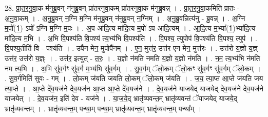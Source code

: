 \documentclass[17pt]{extarticle}
\begin{document}
28. प्रा॒त॒र॒नु॒वा॒क म॑नुब्रु॒वन् न॑नुब्रु॒वन् प्रा॑तरनुवा॒कम् प्रा॑तरनुवा॒क म॑नुब्रु॒वन्न् । . प्रा॒त॒र॒नु॒वा॒कमिति॑ प्रातः - अ॒नु॒वा॒कम् । . अ॒नु॒ब्रु॒वन् न॒ग्नि म॒ग्नि म॑नुब्रु॒वन् न॑नुब्रु॒वन् न॒ग्निम् । . अ॒नु॒ब्रु॒वन्नित्य॑नु - ब्रु॒वन्न् । . अ॒ग्नि म॒पो᳚(1॒) ऽपो᳚ ऽग्नि म॒ग्नि म॒पः । . अ॒प आ॑दि॒त्य मा॑दि॒त्य म॒पो॑ ऽप आ॑दि॒त्यम् । . आ॒दि॒त्य म॒भ्या᳚(1॒)भ्या॑दि॒त्य मा॑दि॒त्य म॒भि । . अ॒भि वि॒पश्य॑ति वि॒पश्य॑ त्य॒भ्य॑भि वि॒पश्य॑ति । . वि॒पश्य॒ त्युपोप॑ वि॒पश्य॑ति वि॒पश्य॒ त्युप॑ । . वि॒पश्य॒तीति॑ वि - पश्य॑ति । . उपै॑न मेन॒ मुपोपै॑नम् । . ए॒न॒ मुत्त॑र॒ उत्त॑र एन मेन॒ मुत्त॑रः । . उत्त॑रो य॒ज्ञो य॒ज्ञ् उत्त॑र॒ उत्त॑रो य॒ज्ञ्ः । . उत्त॑र॒ इत्युत् - त॒रः॒ । . य॒ज्ञो न॑मति नमति य॒ज्ञो य॒ज्ञो न॑मति । . न॒म॒ त्य॒भ्य॑भि न॑मति नम त्य॒भि । . अ॒भि सु॑व॒र्गꣳ सु॑व॒र्ग म॒भ्य॑भि सु॑व॒र्गम् । . सु॒व॒र्गम् ॅलो॒कम् ॅलो॒कꣳ सु॑व॒र्गꣳ सु॑व॒र्गम् ॅलो॒कम् । . सु॒व॒र्गमिति॑ सुवः - गम् । . लो॒कम् ज॑यति जयति लो॒कम् ॅलो॒कम् ज॑यति । . ज॒य॒ त्या॒प्त आ॒प्ते ज॑यति जय त्या॒प्ते । . आ॒प्ते दे॑व॒यज॑ने देव॒यज॑न आ॒प्त आ॒प्ते दे॑व॒यज॑ने । . दे॒व॒यज॑ने याजयेद् याजयेद् देव॒यज॑ने देव॒यज॑ने याजयेत् । . दे॒व॒यज॑न॒ इति॑ देव - यज॑ने । . या॒ज॒ये॒द् भ्रातृ॑व्यवन्त॒म् भ्रातृ॑व्यवन्तं ॅयाजयेद् याजये॒द् भ्रातृ॑व्यवन्तम् । . भ्रातृ॑व्यवन्त॒म् पन्था॒म् पन्था॒म् भ्रातृ॑व्यवन्त॒म् भ्रातृ॑व्यवन्त॒म् पन्था᳚म् । \newline
\end{document}
